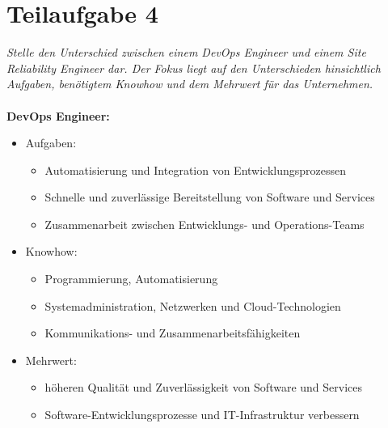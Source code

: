 \chapter{Teilaufgabe 4}

\textit{Stelle den Unterschied zwischen einem DevOps Engineer und einem Site Reliability Engineer dar. Der Fokus liegt auf den Unterschieden hinsichtlich Aufgaben, benötigtem Knowhow und dem Mehrwert für das Unternehmen.}
\\
\\
\textbf{DevOps Engineer:}
\begin{itemize}
    \item Aufgaben:
          \begin{itemize}
              \item Automatisierung und Integration von Entwicklungsprozessen
              \item Schnelle und zuverlässige Bereitstellung von Software und Services
              \item Zusammenarbeit zwischen Entwicklungs- und Operations-Teams
          \end{itemize}
    \item Knowhow:
          \begin{itemize}
              \item Programmierung, Automatisierung
              \item Systemadministration, Netzwerken und Cloud-Technologien
              \item Kommunikations- und Zusammenarbeitsfähigkeiten
          \end{itemize}
    \item Mehrwert:
          \begin{itemize}
              \item höheren Qualität und Zuverlässigkeit von Software und Services
              \item Software-Entwicklungsprozesse und IT-Infrastruktur verbessern
          \end{itemize}
\end{itemize}

